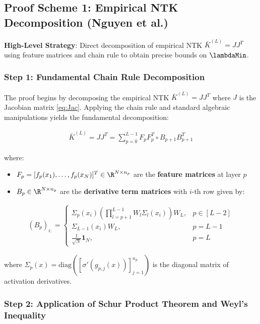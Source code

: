 \documentclass[a4paper]{article}
\theoremstyle{plain}
\theoremstyle{definition}
\theoremstyle{remark}
\begin{document}
\subsection{Proof Scheme 1: Empirical NTK Decomposition (Nguyen et al.)}

\textbf{High-Level Strategy}: Direct decomposition of empirical NTK $\bar{K}^{(L)} = JJ^T$ using feature matrices and chain rule to obtain precise bounds on $\lambdaMin$.

\subsubsection{Step 1: Fundamental Chain Rule Decomposition}

The proof begins by decomposing the empirical NTK $\bar{K}^{(L)} = JJ^T$ where $J$ is the Jacobian matrix \eqref{eq:Jac}. Applying the chain rule and standard algebraic manipulations yields the fundamental decomposition:

\begin{align}
\bar{K}^{(L)} = JJ^T = \sum_{p=0}^{L-1} F_p F_p^T \circ B_{p+1} B_{p+1}^T
\end{align}

where:
\begin{itemize}
    \item $F_p = [f_p(x_1), \ldots, f_p(x_N)]^T \in \R^{N \times n_p}$ are the \textbf{feature matrices} at layer $p$
    \item $B_p \in \R^{N \times n_p}$ are the \textbf{derivative term matrices} with $i$-th row given by:
\end{itemize}

\begin{align}
(B_p)_{i:} = \begin{cases}
\Sigma_p(x_i) \left(\prod_{l=p+1}^{L-1} W_l \Sigma_l(x_i)\right) W_L, & p \in [L-2] \\
\Sigma_{L-1}(x_i) W_L, & p = L-1 \\
\frac{1}{\sqrt{N}} \mathbf{1}_N, & p = L
\end{cases}
\end{align}

where $\Sigma_p(x) = \text{diag}([\sigma'(g_{p,j}(x))]_{j=1}^{n_p})$ is the diagonal matrix of activation derivatives.

\subsubsection{Step 2: Application of Schur Product Theorem and Weyl's Inequality}
\end{document}
